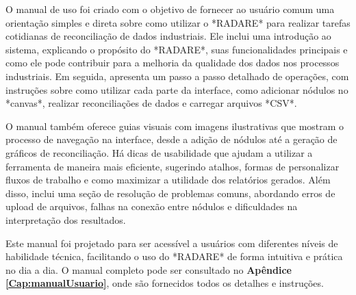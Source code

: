 O manual de uso foi criado com o objetivo de fornecer ao usuário comum uma orientação simples e direta sobre como utilizar o *RADARE* para realizar tarefas cotidianas de reconciliação de dados industriais. Ele inclui uma introdução ao sistema, explicando o propósito do *RADARE*, suas funcionalidades principais e como ele pode contribuir para a melhoria da qualidade dos dados nos processos industriais. Em seguida, apresenta um passo a passo detalhado de operações, com instruções sobre como utilizar cada parte da interface, como adicionar nódulos no *canvas*, realizar reconciliações de dados e carregar arquivos *CSV*.

O manual também oferece guias visuais com imagens ilustrativas que mostram o processo de navegação na interface, desde a adição de nódulos até a geração de gráficos de reconciliação. Há dicas de usabilidade que ajudam a utilizar a ferramenta de maneira mais eficiente, sugerindo atalhos, formas de personalizar fluxos de trabalho e como maximizar a utilidade dos relatórios gerados. Além disso, inclui uma seção de resolução de problemas comuns, abordando erros de upload de arquivos, falhas na conexão entre nódulos e dificuldades na interpretação dos resultados.

Este manual foi projetado para ser acessível a usuários com diferentes níveis de habilidade técnica, facilitando o uso do *RADARE* de forma intuitiva e prática no dia a dia. O manual completo pode ser consultado no \textbf{Apêndice \ref{Cap:manualUsuario}}, onde são fornecidos todos os detalhes e instruções.